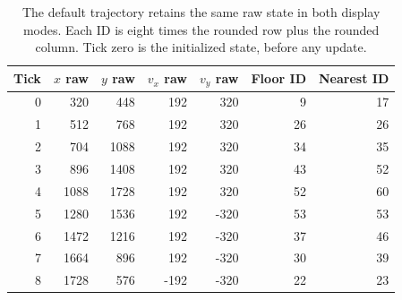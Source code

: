 \begin{table}[htbp]
  \centering
  \small
  \begin{tabular}{rrrrrrr}
    \toprule
    Tick & $x$ raw & $y$ raw & $v_x$ raw & $v_y$ raw & Floor ID & Nearest ID \\
    \midrule
    0    & 320     & 448     & 192       & 320       & 9        & 17         \\
    1    & 512     & 768     & 192       & 320       & 26       & 26         \\
    2    & 704     & 1088    & 192       & 320       & 34       & 35         \\
    3    & 896     & 1408    & 192       & 320       & 43       & 52         \\
    4    & 1088    & 1728    & 192       & 320       & 52       & 60         \\
    5    & 1280    & 1536    & 192       & -320      & 53       & 53         \\
    6    & 1472    & 1216    & 192       & -320      & 37       & 46         \\
    7    & 1664    & 896     & 192       & -320      & 30       & 39         \\
    8    & 1728    & 576     & -192      & -320      & 22       & 23         \\
    \bottomrule
  \end{tabular}
  \caption{The default trajectory retains the same raw state in both display modes. Each ID is eight times the rounded row plus the rounded column. Tick zero is the initialized state, before any update.}
  \label{tab:revision-fixed-trace}
\end{table}
